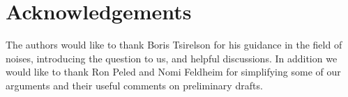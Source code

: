 {
\section{Acknowledgements}

\label{sec:acknowledgements}

The authors would like to thank Boris Tsirelson for his guidance in
the field of noises, introducing the question to us, and helpful
discussions.  In addition we would like to thank Ron Peled and Nomi
Feldheim for simplifying some of our arguments and their useful
comments on preliminary drafts.
}
